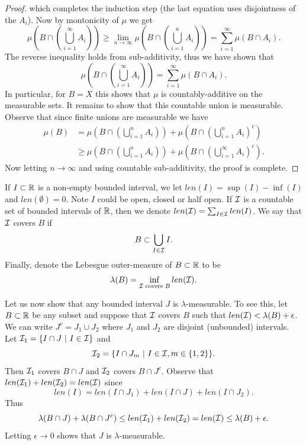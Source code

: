 \documentclass[twoside, a4paper, 10pt]{amsart}
\begin{document}
\begin{proof}
which completes the induction step (the last equation uses disjointness of the $A_i$). Now by montonicity of $\mu$ we get $$\mu\left(B \cap \left(\bigcup_{i=1}^{\infty} A_i\right)\right) \geq \lim_{n \to \infty} \mu\left(B \cap \left(\bigcup_{i=1}^n A_i\right)\right) = \sum_{i=1}^{\infty} \mu(B \cap A_i).$$ The reverse inequality holds from sub-additivity, thus we have shown that $$\mu\left(B \cap \left(\bigcup_{i=1}^{\infty} A_i\right)\right) = \sum_{i=1}^{\infty} \mu(B \cap A_i).$$ In particular, for $B = X$ this shows that $\mu$ is countably-additive on the measurable sets. It remains to show that this countable union is measurable. Observe that since finite unions are measurable we have
\begin{align*} \mu(B) &= \mu\left(B \cap \left(\bigcup_{i=1}^n A_i\right)\right) + \mu\left(B \cap \left(\bigcup_{i=1}^n A_i\right)^c\right) \\
&\geq  \mu\left(B \cap \left(\bigcup_{i=1}^n A_i\right)\right) + \mu\left(B \cap \left(\bigcup_{i=1}^{\infty} A_i\right)^c\right). \end{align*} Now letting $n \to \infty$ and using countable sub-additivity, the proof is complete. \end{proof}


\begin{eg} If $I \subset \mathbb{R}$ is a non-empty bounded interval, we let $len(I) = \sup(I) - \inf(I)$ and $len(\emptyset) = 0$. Note $I$ could be open, closed or half open. If $\mathcal{I}$ is a countable set of bounded intervals of $\mathbb{R}$, then we denote $len(\mathcal{I}) = \sum_{I \in \mathcal{I}} len(I)$. We say that $\mathcal{I}$ covers $B$ if $$ B \subset \bigcup_{I \in \mathcal{I}} I.$$ Finally, denote the Lebesgue outer-measure of $B \subset \mathbb{R}$ to be $$\lambda(B) = \inf_{\mathcal{I} \text{ covers } B} len(\mathcal{I}).$$

Let us now show that any bounded interval $J$ is $\lambda$-measurable. To see this, let $B \subset \mathbb{R}$ be any subset and suppose that $\mathcal{I}$ covers $B$ such that $len(\mathcal{I}) < \lambda(B) + \epsilon$. We can write $J^c = J_1 \cup J_2$ where $J_1$ and $J_2$ are disjoint (unbounded) intervals. Let $\mathcal{I}_1 = \{I \cap J ~|~ I \in \mathcal{I}\}$ and $$\mathcal{I}_2 = \{I \cap J_m ~|~ I \in \mathcal{I}, m \in \{1,2\}\}.$$ Then $\mathcal{I}_1$ covers $B \cap J$ and $\mathcal{I}_2$ covers $B \cap J^c$. Observe that $len(\mathcal{I}_1) + len(\mathcal{I}_2) = len(\mathcal{I})$ since $$len(I) = len(I \cap J_1) + len(I \cap J) + len(I \cap J_2).$$ Thus $$\lambda(B \cap J) + \lambda(B \cap J^c) \leq len(\mathcal{I}_1) + len(\mathcal{I}_2) =len(\mathcal{I}) \leq \lambda(B) + \epsilon.$$ Letting $\epsilon \to 0$ shows that $J$ is $\lambda$-measurable.

\end{eg}
\end{document}
